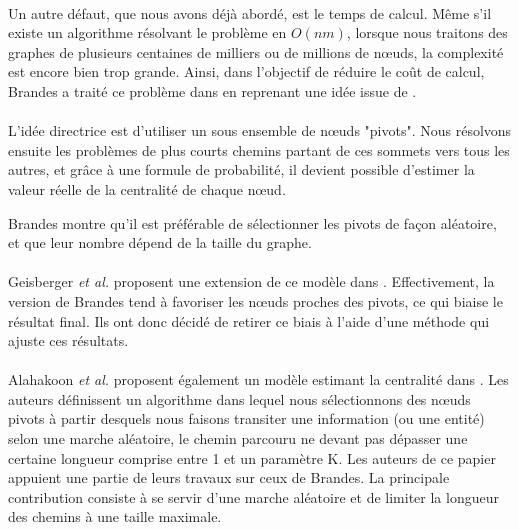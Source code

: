 \documentclass[a4paper, 10pt]{report}
\begin{document}
\paragraph{}Un autre défaut, que nous avons déjà abordé, est le temps de calcul. Même s'il existe un algorithme résolvant le problème en $O(nm)$, lorsque nous traitons des graphes de plusieurs centaines de milliers ou de millions de n\oe uds, la complexité est encore bien trop grande. Ainsi, dans l'objectif de réduire le coût de calcul, Brandes a traité ce problème dans \cite{Brandes2007Centrality} en reprenant une idée issue de \cite{Eppstein2004Fast}.

\paragraph{}L'idée directrice est d'utiliser un sous ensemble de n\oe uds "pivots". Nous résolvons ensuite les problèmes de plus courts chemins partant de ces sommets vers tous les autres, et grâce à une formule de probabilité, il devient possible d'estimer la valeur réelle de la centralité de chaque n\oe ud.

Brandes montre qu'il est préférable de sélectionner les pivots de façon aléatoire, et que leur nombre dépend de la taille du graphe.

\paragraph{}Geisberger \textit{et al.} proposent une extension de ce modèle dans \cite{Geisberger2008Better}. Effectivement, la version de Brandes tend à favoriser les n\oe uds proches des pivots, ce qui biaise le résultat final. Ils ont donc décidé de retirer ce biais à l'aide d'une méthode qui ajuste ces résultats.

\paragraph{}Alahakoon \textit{et al.} proposent également un modèle estimant la centralité dans \cite{Alahakoon2011KPath}. Les auteurs définissent un algorithme dans lequel nous sélectionnons des n\oe uds pivots à partir desquels nous faisons transiter une information (ou une entité) selon une marche aléatoire, le chemin parcouru ne devant pas dépasser une certaine longueur comprise entre 1 et un paramètre K. Les auteurs de ce papier appuient une partie de leurs travaux sur ceux de Brandes. La principale contribution consiste à se servir d'une marche aléatoire et de limiter la longueur des chemins à une taille maximale.
\end{document}

